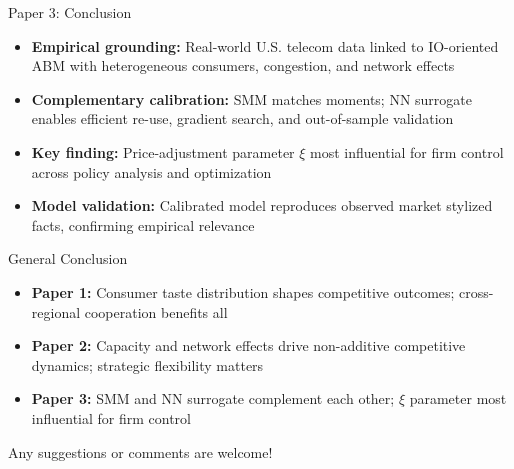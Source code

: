 \documentclass[10pt,aspectratio=169]{beamer}
\begin{document}
\begin{frame}{Paper 3: Conclusion}
\begin{itemize}
    \item \textbf{Empirical grounding:} Real-world U.S. telecom data linked to IO-oriented ABM with heterogeneous consumers, congestion, and network effects

    \vspace{2mm}
    \item \textbf{Complementary calibration:} SMM matches moments; NN surrogate enables efficient re-use, gradient search, and out-of-sample validation

    \vspace{2mm}
    \item \textbf{Key finding:} Price-adjustment parameter $\xi$ most influential for firm control across policy analysis and optimization

    \vspace{2mm}
    \item \textbf{Model validation:} Calibrated model reproduces observed market stylized facts, confirming empirical relevance
\end{itemize}
\end{frame}

\begin{frame}{General Conclusion}
\begin{itemize}
    \item \textbf{Paper 1:} Consumer taste distribution shapes competitive outcomes; cross-regional cooperation benefits all
    \item \textbf{Paper 2:} Capacity and network effects drive non-additive competitive dynamics; strategic flexibility matters
    \item \textbf{Paper 3:} SMM and NN surrogate complement each other; $\xi$ parameter most influential for firm control
\end{itemize}
\vspace{3mm}

\centering
Any suggestions or comments are welcome!

\end{frame}
\end{document}
